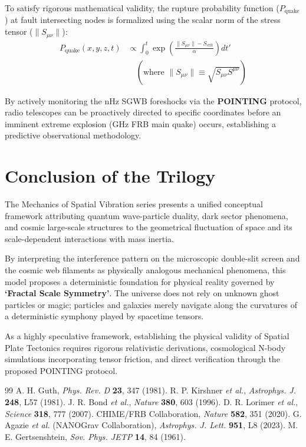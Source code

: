 \documentclass[reprint,amsmath,amssymb,aps,prd]{revtex4-2}
\begin{document}
To satisfy rigorous mathematical validity, the rupture probability function ($P_{\mathrm{quake}}$) at fault intersecting nodes is formalized using the scalar norm of the stress tensor ($\| S_{\mu\nu} \|$):
\begin{equation}
\begin{split}
P_{\mathrm{quake}}(x,y,z, t) &\propto \int_{0}^{t} \exp\left( \frac{\| S_{\mu\nu} \| - S_{\mathrm{crit}}}{\alpha} \right) dt' \\
&\quad \left( \text{where } \| S_{\mu\nu} \| \equiv \sqrt{S_{\mu\nu} S^{\mu\nu}} \right)
\end{split}
\end{equation}

By actively monitoring the nHz SGWB foreshocks via the \textbf{POINTING} protocol, radio telescopes can be proactively directed to specific coordinates before an imminent extreme explosion (GHz FRB main quake) occurs, establishing a predictive observational methodology.

\section{Conclusion of the Trilogy}
The Mechanics of Spatial Vibration series presents a unified conceptual framework attributing quantum wave-particle duality, dark sector phenomena, and cosmic large-scale structures to the geometrical fluctuation of space and its scale-dependent interactions with mass inertia. 

By interpreting the interference pattern on the microscopic double-slit screen and the cosmic web filaments as physically analogous mechanical phenomena, this model proposes a deterministic foundation for physical reality governed by \textbf{`Fractal Scale Symmetry'}. The universe does not rely on unknown ghost particles or magic; particles and galaxies merely navigate along the curvatures of a deterministic symphony played by spacetime tensors.

As a highly speculative framework, establishing the physical validity of Spatial Plate Tectonics requires rigorous relativistic derivations, cosmological N-body simulations incorporating tensor friction, and direct verification through the proposed POINTING protocol.

\begin{thebibliography}{99}
 A. H. Guth, \textit{Phys. Rev. D} \textbf{23}, 347 (1981).
 R. P. Kirshner \textit{et al.}, \textit{Astrophys. J.} \textbf{248}, L57 (1981).
 J. R. Bond \textit{et al.}, \textit{Nature} \textbf{380}, 603 (1996).
 D. R. Lorimer \textit{et al.}, \textit{Science} \textbf{318}, 777 (2007).
 CHIME/FRB Collaboration, \textit{Nature} \textbf{582}, 351 (2020).
 G. Agazie \textit{et al.} (NANOGrav Collaboration), \textit{Astrophys. J. Lett.} \textbf{951}, L8 (2023).
 M. E. Gertsenshtein, \textit{Sov. Phys. JETP} \textbf{14}, 84 (1961).
\end{thebibliography}
\end{document}
